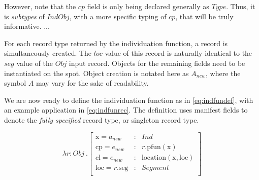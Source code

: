 \documentclass[11pt, a4paper]{article}
\begin{document}
However, note that the $cp$ field is only being declared generally as $Type$.
Thus, it is \textit{subtypes} of $IndObj$, with a more specific typing of $cp$, that will be truly informative.
...

For each record type returned by the individuation function, a record is simultaneously created.
The $loc$ value of this record is naturally identical to the $seg$ value of the $Obj$ input record.
Objects for the remaining fields need to be instantiated on the spot.
Object creation is notated here as $A_{new}$, where the symbol $A$ may vary for the sake of readability.

We are now ready to define the individuation function as in \autoref{eq:indfundef}, with an example application in \autoref{eq:indfunrec}.
The definition uses manifest fields to denote the \textit{fully specified} record type, or singleton record type.

\begin{equation}\label{eq:indfundef}
\lambda r : Obj\ . \left[\begin{array}{lcl}
    \text{x} = a_{new} &:& Ind \\
    \text{cp} = e_{new} &:& r.\text{pfun}(\text{x}) \\
    \text{cl} = e_{new} &:& \text{location}(\text{x}, \text{loc}) \\
    \text{loc} = r.\text{seg} &:& Segment\\
\end{array}\right]
\end{equation}
\end{document}
